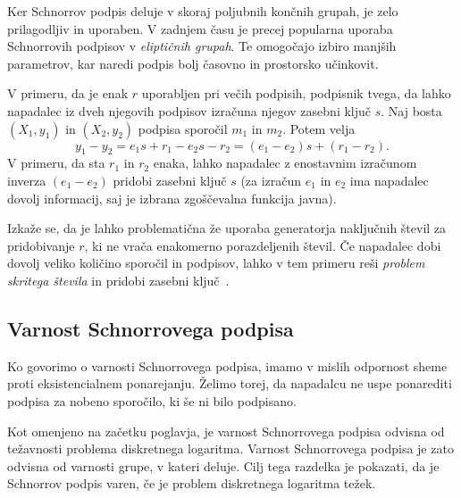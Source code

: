 Ker Schnorrov podpis deluje v skoraj poljubnih končnih grupah, je zelo prilagodljiv in uporaben.
V zadnjem času je precej popularna uporaba Schnorrovih podpisov v \textit{eliptičnih grupah}.
Te omogočajo izbiro manjših parametrov, kar naredi podpis bolj časovno in prostorsko učinkovit.

\begin{opomba}
\label{opomba:nonce}
    V primeru, da je enak $r$ uporabljen pri večih podpisih, podpisnik tvega, da lahko napadalec iz
    dveh njegovih podpisov izračuna njegov zasebni ključ $s$. Naj bosta $(X_1, y_1)$ in $(X_2, y_2)$
    podpisa sporočil $m_1$ in $m_2$. Potem velja
    $$
    y_1 - y_2 = e_1 s + r_1 - e_2 s - r_2 = (e_1 - e_2)s + (r_1 - r_2).
    $$
    V primeru, da sta $r_1$ in $r_2$ enaka, lahko napadalec z enostavnim izračunom inverza $(e_1 - e_2)$
    pridobi zasebni ključ $s$ (za izračun $e_1$ in $e_2$ ima napadalec dovolj informacij, saj je
    izbrana zgoščevalna funkcija javna).

    Izkaže se, da je lahko problematična že uporaba generatorja naključnih števil za pridobivanje
    $r$, ki ne vrača enakomerno porazdeljenih števil. Če napadalec dobi dovolj veliko količino
    sporočil in podpisov, lahko v tem primeru reši \textit{problem skritega števila} in pridobi
    zasebni ključ~\cite{tibouchi2017attacks}.
\end{opomba}

\subsection{Varnost Schnorrovega podpisa}
\label{sec:schnorr-sec}
Ko govorimo o varnosti Schnorrovega podpisa, imamo v mislih odpornost sheme proti eksistencialnem
ponarejanju. Želimo torej, da napadalcu ne uspe ponarediti podpisa za nobeno sporočilo, ki še ni
bilo podpisano.

Kot omenjeno na začetku poglavja, je varnost Schnorrovega podpisa odvisna od težavnosti problema
diskretnega logaritma. Varnost Schnorrovega podpisa je zato odvisna od varnosti grupe, v kateri deluje.
Cilj tega razdelka je pokazati, da je Schnorrov podpis varen, če je problem diskretnega logaritma
težek.

